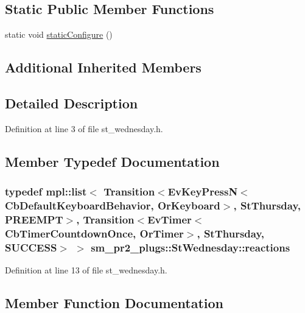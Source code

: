 \subsection*{Static Public Member Functions}
\begin{DoxyCompactItemize}
\item 
static void \hyperlink{structsm__pr2__plugs_1_1StWednesday_a87c148345ff476873c665ac128b88cb4}{static\+Configure} ()
\end{DoxyCompactItemize}
\subsection*{Additional Inherited Members}


\subsection{Detailed Description}


Definition at line 3 of file st\+\_\+wednesday.\+h.



\subsection{Member Typedef Documentation}
\subsubsection[{\texorpdfstring{reactions}{reactions}}]{\setlength{\rightskip}{0pt plus 5cm}typedef mpl\+::list$<$ Transition$<$Ev\+Key\+PressN$<$Cb\+Default\+Keyboard\+Behavior, {\bf Or\+Keyboard}$>$, {\bf St\+Thursday}, {\bf P\+R\+E\+E\+M\+PT}$>$, Transition$<$Ev\+Timer$<$Cb\+Timer\+Countdown\+Once, {\bf Or\+Timer}$>$, {\bf St\+Thursday}, {\bf S\+U\+C\+C\+E\+SS}$>$ $>$ {\bf sm\+\_\+pr2\+\_\+plugs\+::\+St\+Wednesday\+::reactions}}\hypertarget{structsm__pr2__plugs_1_1StWednesday_a36fe111ecdc29a99a855ef7fe089b4d5}{}\label{structsm__pr2__plugs_1_1StWednesday_a36fe111ecdc29a99a855ef7fe089b4d5}


Definition at line 13 of file st\+\_\+wednesday.\+h.



\subsection{Member Function Documentation}
